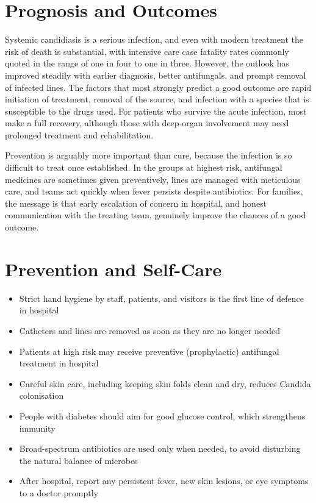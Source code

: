 \section*{Prognosis and Outcomes}
Systemic candidiasis is a serious infection, and even with modern treatment the risk of death is substantial, with intensive care case fatality rates commonly quoted in the range of one in four to one in three. However, the outlook has improved steadily with earlier diagnosis, better antifungals, and prompt removal of infected lines. The factors that most strongly predict a good outcome are rapid initiation of treatment, removal of the source, and infection with a species that is susceptible to the drugs used. For patients who survive the acute infection, most make a full recovery, although those with deep-organ involvement may need prolonged treatment and rehabilitation.

Prevention is arguably more important than cure, because the infection is so difficult to treat once established. In the groups at highest risk, antifungal medicines are sometimes given preventively, lines are managed with meticulous care, and teams act quickly when fever persists despite antibiotics. For families, the message is that early escalation of concern in hospital, and honest communication with the treating team, genuinely improve the chances of a good outcome.

\section*{Prevention and Self-Care}
\begin{itemize}
    \item Strict hand hygiene by staff, patients, and visitors is the first line of defence in hospital
    \item Catheters and lines are removed as soon as they are no longer needed
    \item Patients at high risk may receive preventive (prophylactic) antifungal treatment in hospital
    \item Careful skin care, including keeping skin folds clean and dry, reduces Candida colonisation
    \item People with diabetes should aim for good glucose control, which strengthens immunity
    \item Broad-spectrum antibiotics are used only when needed, to avoid disturbing the natural balance of microbes
    \item After hospital, report any persistent fever, new skin lesions, or eye symptoms to a doctor promptly
\end{itemize}

